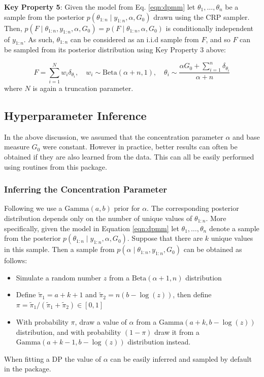 \documentclass[nojss]{jss}
\begin{document}
\begin{tcolorbox}
\textbf{Key Property 5}: Given the model from Eq. \eqref{eqn:dpmm} let $\theta_1,\ldots,\theta_n$  be a sample from the posterior $p(\theta_{1:n} \mid y_{1:n},\alpha,G_0)$ drawn using the CRP sampler. Then, $p(F \mid \theta_{1:n},y_{1:n},\alpha,G_0) = p(F\mid\theta_{1:n},\alpha,G_0)$ is conditionally independent of $y_{1:n}$. As such, $\theta_{1:n}$ can be considered as an i.i.d sample from $F$, and so $F$ can be sampled from its posterior distribution using Key Property 3 above:

$$F = \sum_{i=1}^N w_i \delta_{\theta_i}, \quad w_i \sim \text{Beta}(\alpha+n,1), \quad \theta_i \sim \frac{\alpha G_0 + \sum_{i=1}^n \delta_{\theta _i}}{\alpha + n}$$
where $N$ is again a truncation parameter.
\end{tcolorbox}


\subsection{Hyperparameter Inference} \label{subsec:hyperparam}

In the above discussion, we assumed that the concentration parameter $\alpha$ and base measure $G_0$ were constant. However in practice, better results can often be obtained if they are also learned from the data. This can all be easily performed using routines from this package.

\subsubsection{Inferring the Concentration Parameter}\label{subsubsec:concentration}
Following \cite{west_hyperparameter_1992} we use a $\text{Gamma} (a, b)$ prior for $\alpha$. The corresponding posterior distribution depends only on the number of unique values of $\theta_{1:n}$. More specifically, given the model in Equation \eqref{eqn:dpmm} let $\theta_1,\ldots,\theta_n$ denote a sample from the posterior $p(\theta_{1:n} \mid y_{1:n} , \alpha, G_0 )$. Suppose that there are $k$ unique values in this sample. Then a sample from $p(\alpha \mid \theta_{1:n}, y_{1:n} , G_0)$ can be obtained as follows:

\begin{itemize}
\item Simulate a random number $z$ from a $\text{Beta}(\alpha + 1, n)$ distribution
\item Define $\tilde{\pi}_1 = a + k + 1$ and $\tilde{\pi}_2 = n (b - \log(z))$, then define $\pi = \tilde{\pi}_1/(\tilde{\pi}_1 + \tilde{\pi}_2) \in [0, 1]$
\item With probability $\pi$, draw a value of $\alpha$ from a $\text{Gamma} (a + k, b - \log(z))$ distribution, and with probability $(1 - \pi)$ draw it from a $\text{Gamma}(a + k - 1, b - \log(z))$ distribution instead.
\end{itemize}
When fitting a DP the value of $\alpha$ can be easily inferred and sampled by default in the  package.
\end{document}
